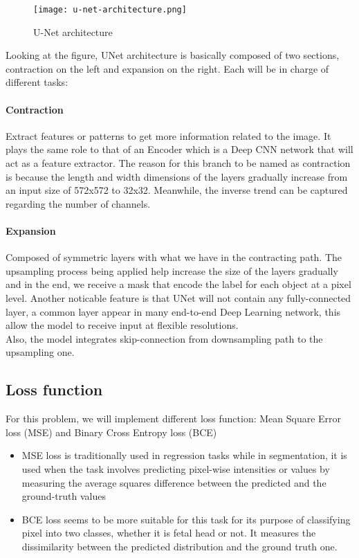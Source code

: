 \documentclass{article}
\begin{document}
\begin{figure}[h]
    \centering
    \texttt{[image: u-net-architecture.png]}
    \caption{U-Net architecture}
\end{figure}

\noindent Looking at the figure, UNet architecture is basically composed
of two sections, contraction on the left and expansion on the right.
Each will be in charge of different tasks:

\paragraph{Contraction} Extract features or patterns to get more information
related to the image. It plays the same role to that of an Encoder which is
a Deep CNN network that will act as a feature extractor. The reason for this
branch to be named as contraction is because the length and width dimensions
of the layers gradually increase from an input size of 572x572 to 32x32. Meanwhile,
the inverse trend can be captured regarding the number of channels.

\paragraph{Expansion} Composed of symmetric layers with what we have
in the contracting path. The upsampling process being applied
help increase the size of the layers gradually and in the end,
we receive a mask that encode the label for each object
at a pixel level. Another noticable feature is that UNet will
not contain any fully-connected layer, a common layer appear
in many end-to-end Deep Learning network, this allow the model
to receive input at flexible resolutions.\\

\noindent Also, the model integrates skip-connection from downsampling path
to the upsampling one. 

\subsection{Loss function} For this problem, we will implement different
loss function: Mean Square Error loss (MSE) and Binary Cross Entropy loss (BCE)

\begin{itemize}
    \item MSE loss is traditionally used in regression tasks while
in segmentation, it is used when the task involves predicting pixel-wise
intensities or values by measuring the average squares difference
between the predicted and the ground-truth values

    \item BCE loss seems to be more suitable for this task for its
purpose of classifying pixel into two classes, whether it is fetal head or not.
It measures the dissimilarity between the predicted distribution and the ground
truth one.
\end{itemize}
\end{document}
